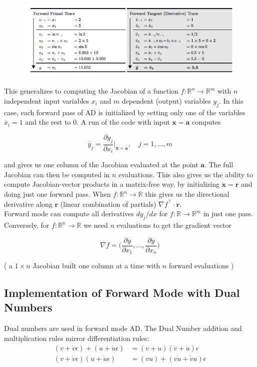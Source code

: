 \documentclass[11pt]{article}
\theoremstyle{definition}
\theoremstyle{plain}
\renewcommand{\v}[1]{\mathbf{#1}}
\renewcommand{\b}[1]{\mathbb{#1}}
\begin{document}
\begin{figure}[H]
\includegraphics[width=12cm]{forward_dual}
\centering
\end{figure}


\noindent 
This generalizes to computing the Jacobian of a function $f: \b{R}^n \rightarrow \b{R}^m$
with $n$ independent input variables $x_i$ and $m$ dependent (output) variables $y_j$.
In this case, each forward pass of AD is initialized by setting only one of the variables
$\dot{x_i}=1$ and the rest to $0$. A run of the code with input $\v{x}=\v{a}$ computes

        $$ \dot{y_j} = \frac{\partial y_j}{\partial x_i} \rvert_{\v{x}=\v{a}}, 
            \quad j=1,...,m $$

\noindent and gives us one column of the Jacobian evaluated at the point $\v{a}$. The full
Jacobian can then be computed in $n$ evaluations. 
This also gives us the ability to compute Jacobian-vector products in a matrix-free way,
by initializing $\dot{\v{x}}=\v{r}$ and doing just one forward pass. When $f:\b{R}^n \rightarrow
\b{R}$ this gives us the directional derivative along $\v{r}$ (linear combination of partials)
$\nabla f^\top \cdot \v{r}$.\\

\noindent Forward mode can compute all derivatives $d y_j / dx$ for $f: \b{R} \rightarrow \b{R}^m$ in just one pass. Conversely, for $f: \b{R}^n \rightarrow \b{R}$ we need $n$ evaluations
to get the gradient vector

$$ \nabla f = \Big( \frac{\partial y}{\partial x_1},...,\frac{\partial y}{\partial x_n} \Big )$$

\noindent( a $1 \times n$ Jacobian built one column at a time with $n$ forward evaluations )

\newpage

\subsection{Implementation of Forward Mode with Dual Numbers}

\noindent Dual numbers are used in forward mode AD. The Dual Number addition
and multiplication rules mirror differentiation rules:
\begin{align*}
    (v + \dot{v} \epsilon) + (u + \dot{u} \epsilon) &= (v+u) (\dot{v}+\dot{u})\epsilon\\
    (v + \dot{v} \epsilon)(u + \dot{u}\epsilon) &= (vu) + (v \dot{u} + \dot{v} u )\epsilon
\end{align*}
\end{document}
